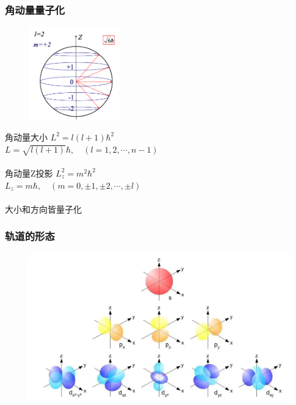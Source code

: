 \begin{frame} 
    \frametitle{角动量量子化}
    \begin{figure} %
        \includegraphics[width=0.35\textwidth]{figs/LandL2.png}   
    \end{figure}
    {\Bullet} 角动量大小  $L^2=l(l+1) \hbar^2$\\
	$L=\sqrt{l(l+1)}\hbar, \quad (l=1,2,\cdots, n-1)$\\
    ~~\\ \vspace{0.3em}
    {\Bullet} 角动量Z投影 $L^2_z=m^2\hbar^2$\\
    $L_z=m\hbar, \quad (m=0,\pm 1,\pm 2, \cdots, \pm l)$\\
	~~\\
    {\Bullet} 大小和方向皆量子化
\end{frame} 

\begin{frame}
	  \frametitle{轨道的形态}
		\begin{center}
			 \includegraphics[width=1.0\textwidth,height=2.5in]{figs/2022-03-25-19-35-50.png}
		\end{center}	 
\end{frame}	

